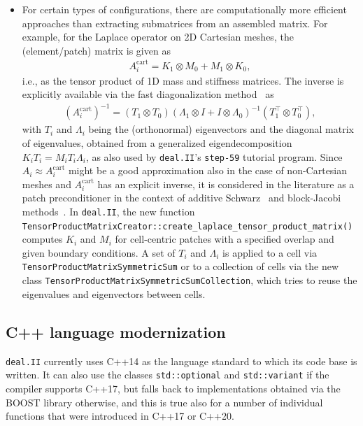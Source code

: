 \documentclass{ansarticle-preprint}
\newcommand{\specialword}[1]{\texttt{#1}}
\newcommand{\dealii}{{\specialword{deal.II}}\xspace}
\begin{document}
\begin{itemize}
  \item For certain types of configurations, there are computationally more efficient
  approaches than extracting submatrices from an assembled matrix. For
  example, for the Laplace
  operator on 2D Cartesian meshes, the (element/patch) matrix is given as
  \begin{align*}
  A_i^{\text{cart}} = K_1 \otimes M_0 + M_1 \otimes K_0,
  \end{align*}
  i.e., as the tensor product of 1D mass and stiffness matrices. The inverse is
  explicitly available via the fast diagonalization method~\cite{lynch1964direct} as
  \begin{align*}
  \left(A_i^{\text{cart}}\right)^{-1} = (T_1 \otimes T_0) (\Lambda_1 \otimes I + I \otimes \Lambda_0)^{-1} (T_1^\top \otimes T_0^\top),
  \end{align*}
  with $T_i$ and $\Lambda_i$ being the (orthonormal) eigenvectors and the diagonal
  matrix of eigenvalues, obtained from a generalized eigendecomposition
  $K_iT_i =  M_i T_i \Lambda_i$, as also used by \dealii's \texttt{step-59} tutorial program.
  Since $A_i \approx A_i^{\text{cart}}$
  might be a good approximation also in the case of non-Cartesian meshes and 
  $A_i^{\text{cart}}$ has an explicit inverse, it is considered in the
  literature as a patch preconditioner in the context of additive
  Schwarz~\cite{witte2021fast, phillips2021auto, couzy1995spectral} and block-Jacobi methods~\cite{kronbichler2019hermite}.
  In \dealii, the new function
  \texttt{Tensor\-Product\-Matrix\-Creator::create\_\allowbreak laplace\_\allowbreak tensor\_\allowbreak product\_\allowbreak matrix()} computes $K_i$ and $M_i$
  for cell-centric patches with a specified overlap and given boundary conditions.
  A set of $T_i$ and $\Lambda_i$ is applied to a cell via
  \texttt{Tensor\-Product\-Matrix\-Symmetric\-Sum} or to a collection of cells
  via the new class \texttt{Tensor\-Product\-Matrix\-Symmetric\-Sum\-Collection}, which
  tries to reuse the eigenvalues and eigenvectors between cells.
\end{itemize}


\subsection{C++ language modernization}\label{sec:language}

\dealii{} currently uses C++14 as the language standard to which its
code base is written. It can also use the classes
\texttt{std::optional} and \texttt{std::variant} if the compiler
supports C++17, but falls back to implementations obtained via the
BOOST library otherwise, and this is true also for a number of
individual functions that were introduced in C++17 or C++20.
\end{document}

